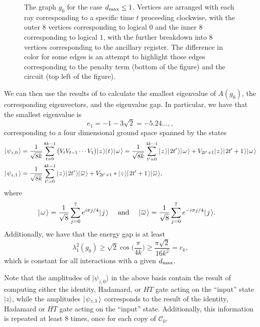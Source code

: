 \documentclass[../thesis-main/thesis-main]{subfiles}
\begin{document}
\begin{figure}
  \centering
  
  \caption[The graph $g_0$]{The graph $g_{0}$ for the case $d_{\text{max}} \leq 1$.  Vertices are arranged with each ray corresponding to a specific time $t$ proceeding clockwise, with the outer 8 vertices corresponding to logical $0$ and the inner 8 corresponding to logical $1$, with the further breakdown into 8 vertices corresponding to the ancillary register.  The difference in color for some edges is an attempt to highlight those edges corresponding to the penalty term (bottom of the figure) and the circuit (top left of the figure).  \label{fig:g_0}}
\end{figure}

We can then use the results of  to calculate the smallest eigenvalue of $A(g_0)$, the corresponding eigenvectors, and the eigenvalue gap.  In particular, we have that the smallest eigenvalue is 
\begin{equation}
  e_1 = -1 - 3 \sqrt{2} = -5.24\ldots, \label{eq:e_1},
\end{equation}
corresponding to a four dimensional ground space spanned by the states
\begin{align}
  |\mspace{2mu} \psi_{z,0} \mspace{2mu} \rangle &= \frac{1}{\sqrt{8k}}\sum_{t=0}^{8k-1} \big(V_t V_{t-1} \cdots V_1\big) |\mspace{2mu} z \mspace{2mu} \rangle |\mspace{2mu} t \mspace{2mu} \rangle |\mspace{2mu} \omega \mspace{2mu} \rangle= \frac{1}{\sqrt{8k}}\sum_{t'=0}^{4k-1} |\mspace{2mu} z \mspace{2mu} \rangle |\mspace{2mu} 2t' \mspace{2mu} \rangle|\mspace{2mu} \omega \mspace{2mu} \rangle + V_{2t' + 1} |\mspace{2mu} z \mspace{2mu} \rangle |\mspace{2mu} 2t'+1 \mspace{2mu} \rangle|\mspace{2mu} \omega \mspace{2mu} \rangle\label{eq:psi0m}\\
  |\mspace{2mu} \psi_{z,1} \mspace{2mu} \rangle &= \frac{1}{\sqrt{8k}} \sum_{t'=0}^{4k-1} |\mspace{2mu} z \mspace{2mu} \rangle|\mspace{2mu} 2t' \mspace{2mu} \rangle |\mspace{2mu} \overline{\omega} \mspace{2mu} \rangle + V_{2t'+1}* |\mspace{2mu} z \mspace{2mu} \rangle |\mspace{2mu} 2t'+1 \mspace{2mu} \rangle |\mspace{2mu} \overline{\omega} \mspace{2mu} \rangle\label{eq:psi1m},
\end{align}
where
\begin{align}
  |\mspace{2mu} \omega \mspace{2mu} \rangle &= \frac{1}{\sqrt{8}} \sum_{j=0}^{7} e^{i \pi j/4} |\mspace{2mu} j \mspace{2mu} \rangle &\text{ and } &&
  |\mspace{2mu} \overline{\omega} \mspace{2mu} \rangle &= \frac{1}{\sqrt{8}} \sum_{j=0}^7 e^{-i \pi j/4} |\mspace{2mu} j \mspace{2mu} \rangle.
\end{align}
Additionally, we have that the energy gap is at least 
\begin{equation}
  \lambda_1^2(g_0) \geq \sqrt{2} \cos\Big(\frac{\pi}{4k}\Big) \geq \frac{\pi\sqrt{2}}{16 k^2} = c_k,
\end{equation}
which is constant for all interactions with a given $d_{\text{max}}$.



Note that the amplitudes of $|\psi_{z,0}\rangle$ in the above basis contain the result of computing either the identity, Hadamard, or $HT$ gate acting on the ``input'' state $|z\rangle$, while the amplitudes $|\mspace{2mu} \psi_{z,1} \mspace{2mu} \rangle$ corresponds to the result of the identity, Hadamard or $\overline{HT}$ gate acting on the ``input'' state.  Additionally, this information is repeated at least $8$ times, once for each copy of $\mathcal{C}_0$.
\end{document}
